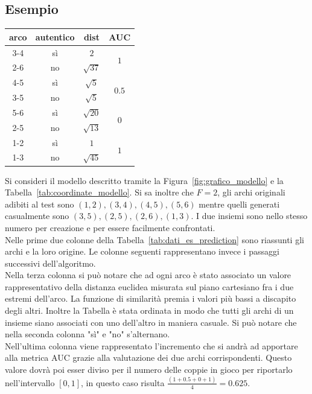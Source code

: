 \subsection{Esempio}
\begin{center}
	\begin{tabular}{|c|c|c|c|}
		\hline
		arco & autentico & dist & AUC\\
		\hline
		3-4 & sì & $2$ & \multirow{2}{*}{$1$}\\
		2-6 & no & $\sqrt{37}$ & \\
		\hline
		4-5 & sì & $\sqrt{5}$ & \multirow{2}{*}{$0.5$}\\
		3-5 & no & $\sqrt{5}$ & \\
		\hline
		5-6 & sì & $\sqrt{20}$ & \multirow{2}{*}{$0$}\\
		2-5 & no & $\sqrt{13}$ & \\
		\hline
		1-2 & sì & $1$ & \multirow{2}{*}{$1$}\\
		1-3 & no & $\sqrt{45}$ & \\
		\hline
	\end{tabular}
	\label{tab:dati_es_prediction}
\end{center}
Si consideri il modello descritto tramite la Figura~\ref{fig:grafico_modello} e la Tabella~\ref{tab:coordinate_modello}. Si sa inoltre che $F=2$, gli archi originali adibiti al test sono $(1, 2), (3, 4), (4, 5), (5, 6)$ mentre quelli generati casualmente sono $(3, 5), (2, 5), (2, 6), (1, 3)$. I due insiemi sono nello stesso numero per creazione e per essere facilmente confrontati.\\
Nelle prime due colonne della Tabella~\ref{tab:dati_es_prediction} sono riassunti gli archi e la loro origine. Le colonne seguenti rappresentano invece i passaggi successivi dell'algoritmo.\\
Nella terza colonna si può notare che ad ogni arco è stato associato un valore rappresentativo della distanza euclidea misurata sul piano cartesiano fra i due estremi dell'arco. La funzione di similarità premia i valori più bassi a discapito degli altri. Inoltre la Tabella è stata ordinata in modo che tutti gli archi di un insieme siano associati con uno dell'altro in maniera casuale. Si può notare che nella seconda colonna "sì" e "no" s'alternano.\\
Nell'ultima colonna viene rappresentato l'incremento che si andrà ad apportare alla metrica AUC grazie alla valutazione dei due archi corrispondenti. Questo valore dovrà poi esser diviso per il numero delle coppie in gioco per riportarlo nell'intervallo $[0, 1]$, in questo caso risulta $ \frac{\left( 1+0.5+0+1 \right)}{4} = 0.625$.\\
